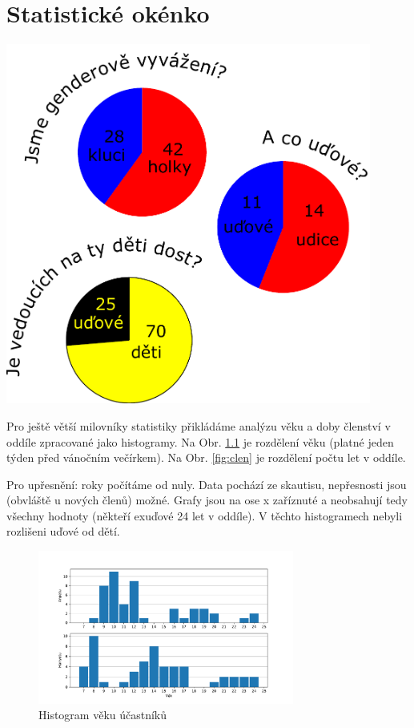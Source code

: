 \chapter{Statistické okénko}
\label{statistika}

\begin{center}

\includegraphics[width=12cm]{img/statistika/grafy-kolacove.pdf}

\end{center}


\clearpage

Pro ještě větší milovníky statistiky přikládáme analýzu věku a doby členství v oddíle zpracované jako histogramy. Na Obr. \ref{fig:vek} je rozdělení věku (platné jeden týden před vánočním večírkem). Na Obr. \ref{fig:clen} je rozdělení počtu let v oddíle.

Pro upřesnění: roky počítáme od nuly. Data pochází ze skautisu, nepřesnosti jsou (obvláště u nových členů) možné. Grafy jsou na ose x zaříznuté a neobsahují tedy všechny hodnoty (někteří exuďové 24 let v oddíle). V těchto histogramech nebyli rozlišeni uďové od dětí.

\begin{figure}[!ht]
  \begin{center}
    \includegraphics[width=0.75\textwidth]{statistika/hist_vek.pdf}
  \end{center}
  \caption{Histogram věku účastníků}
  \label{fig:vek}
\end{figure}


